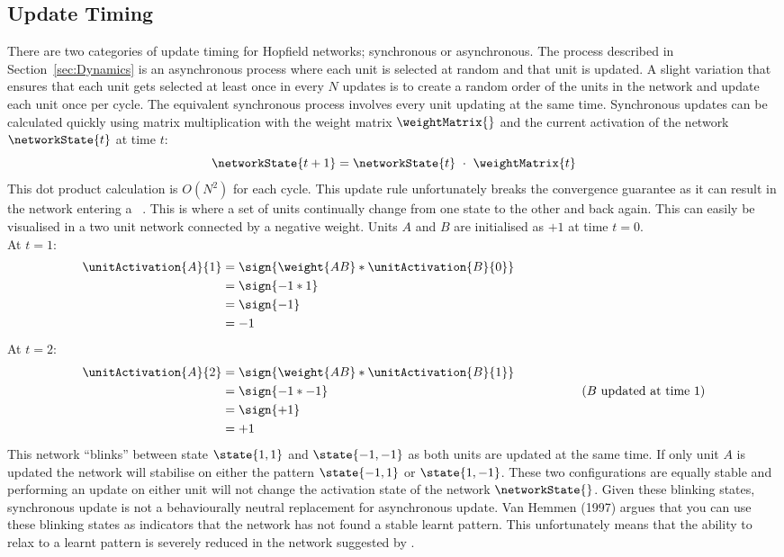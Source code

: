\subsection{Update Timing}
\label{sec:update}
There are two categories of update timing for Hopfield networks; synchronous or asynchronous.  The process described in Section~\ref{sec:Dynamics} is an asynchronous process where each unit is selected at random and that unit is updated.  A slight variation that ensures that each unit gets selected at least once in every $N$ updates is to create a random order of the units in the network and update each unit once per cycle.  The equivalent synchronous process involves every unit updating at the same time. Synchronous updates can be calculated quickly using matrix multiplication with the weight matrix $\weightMatrix{}$ and the current activation of the network $\networkState{t}$ at time $t$:
\begin{equation}
	\networkState{t+1} = \networkState{t}\ \cdot\ \weightMatrix{t} 
\end{equation}
This dot product calculation is $O(N^2)$ for each cycle.  This update rule unfortunately breaks the convergence guarantee as it can result in the network entering a ~\citep{vanHemmen1997}.  This is where a set of units continually change from one state to the other and back again.  This can easily be visualised in a two unit network connected by a negative weight.  Units $A$ and $B$ are initialised as $+1$ at time $t=0$. \\
At $t=1$:
\begin{align*}
		\unitActivation{A}{1} &= \sign{\weight{AB}*\unitActivation{B}{0}}\\
													&= \sign{-1*1}\\
													&= \sign{-1}&\hspace{5cm}\\
													&= -1
\end{align*}
At $t=2$:
\begin{align*}
		\unitActivation{A}{2} &= \sign{\weight{AB}*\unitActivation{B}{1}}\\
													&= \sign{-1*-1}&(B\ \mathrm{updated\ at\ time\ 1})\\
													&= \sign{+1}&\hspace{5cm}\\
													&= +1
\end{align*}
This network ``blinks'' between state $\state{1,1}$ and $\state{-1,-1}$ as both units are updated at the same time. If only unit $A$ is updated the network will stabilise on either the pattern $\state{-1,1}$ or $\state{1,-1}$.  These two configurations are equally stable and performing an update on either unit will not change the activation state of the network $\networkState{}$.  Given these blinking states, synchronous update is not a behaviourally neutral replacement for asynchronous update.  Van Hemmen (1997) argues that you can use these blinking states as indicators that the network has not found a stable learnt pattern.  This unfortunately means that the ability to relax to a learnt pattern is severely reduced in the network suggested by \citeauthor{vanHemmen1997}.

